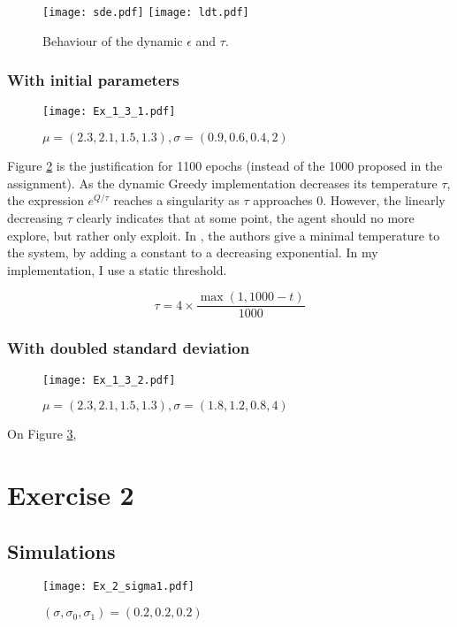 \documentclass[a4paper,11pt]{article}
\begin{document}
\begin{figure}[H]
  \center
  \texttt{[image: sde.pdf]}
  \texttt{[image: ldt.pdf]}
  \caption{\label{fig:timevar} Behaviour of the dynamic $\epsilon$ and $\tau$.}
\end{figure}

\subsubsection{With initial parameters}
\begin{figure}[H]
  \center
  \texttt{[image: Ex\_1\_3\_1.pdf]}
  \caption{\label{fig:1.3.1} $\mu = (2.3, 2.1, 1.5, 1.3), \sigma = (0.9, 0.6, 0.4, 2)$}
\end{figure}

Figure \ref{fig:1.3.1} is the justification for 1100 epochs (instead of the 1000 proposed in the assignment). As the dynamic Greedy implementation decreases its temperature $\tau$, the expression $e^{Q/\tau}$ reaches a singularity as $\tau$ approaches 0. However, the linearly decreasing $\tau$ clearly indicates that at some point, the agent should no more explore, but rather only exploit. In \cite{Kapetanakis2005}, the authors give a minimal temperature to the system, by adding a constant to a decreasing exponential. In my implementation, I use a static threshold.

$$ \tau = 4 \times \frac{\max(1, 1000-t)}{1000} $$



\subsubsection{With doubled standard deviation}
\begin{figure}[H]
  \center
  \texttt{[image: Ex\_1\_3\_2.pdf]}
  \caption{\label{fig:1.3.2} $\mu = (2.3, 2.1, 1.5, 1.3), \sigma = (1.8, 1.2, 0.8, 4)$}
\end{figure}

On Figure \ref{fig:1.3.2},

\section{Exercise 2}
\subsection{Simulations}
\begin{figure}[H]
  \center
  \texttt{[image: Ex\_2\_sigma1.pdf]}
  \caption{\label{fig:2.1} $(\sigma, \sigma_{0}, \sigma_{1}) = (0.2, 0.2, 0.2)$}
\end{figure}
\end{document}
